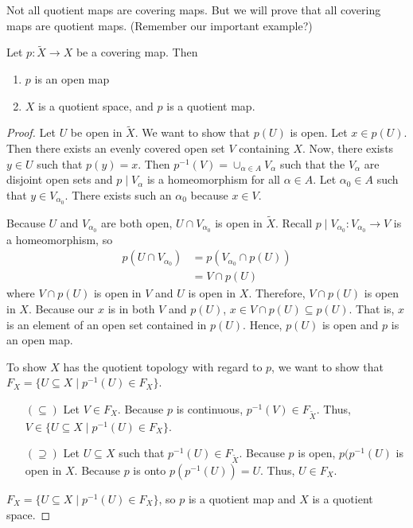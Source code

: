 Not all quotient maps are covering maps. But we will prove that all covering maps are quotient maps. (Remember our important example?)
\begin{theorem}
	Let $p:\widetilde{X}\rightarrow X$ be a covering map. Then 
	\begin{enumerate}
		\item $p$ is an open map 
		\item $X$ is a quotient space, and $p$ is a quotient map. 
	\end{enumerate}
\end{theorem}
\begin{proof}
	Let $U$ be open in $\widetilde{X}$. We want to show that $p(U)$ is open. Let $x \in p(U).$ Then there exists an evenly covered open set $V$ containing $X$. Now, there exists $y \in U$ such that $p(y)=x.$ Then $p^{-1}(V)=\cup_{\alpha \in A}V_{\alpha}$ such that the $V_{\alpha}$ are disjoint open sets and $p \mid V_{\alpha}$ is a homeomorphism for all $\alpha \in A$. Let $\alpha_0 \in A$ such that $y \in V_{\alpha_0}$. There exists such an $\alpha_0$ because $x \in V$.
	
	Because $U$ and $V_{\alpha_0}$ are both open, $U\cap V_{\alpha_0}$ is open in $\widetilde{X}$. Recall $p\mid V_{\alpha_0}:V_{\alpha_0}\rightarrow V$ is a homeomorphism, so 
	\begin{align*}
		p(U\cap V_{\alpha_0})&=p\left(V_{\alpha_0}\cap p(U)\right)\\
		&=V\cap p(U) 
	\end{align*}
	where $V\cap p(U)$ is open in $V$ and $U$ is open in $X$. Therefore, $V\cap p(U)$ is open in $X$. Because our $x$ is in both $V$ and $p(U)$, $x\in V\cap p(U)\subseteq p(U)$. That is, $x$ is an element of an open set contained in $p(U)$. Hence, $p(U)$ is open and $p$ is an open map. 
	\item To show $X$ has the quotient topology with regard to $p$, we want to show that $F_X = \{U\subseteq X \mid p^{-1}(U)\in F_X\}$.
	\begin{itemize}
		\item[$(\subseteq)$] Let $V\in F_X$. Because $p$ is continuous, $p^{-1}(V)\in F_{\widetilde{X}}$. Thus, $V\in \{U\subseteq X \mid p^{-1}(U)\in F_X\}$.
		
		\item[$(\supseteq)$] Let $U\subseteq X$ such that $p^{-1}(U)\in F_{\widetilde{X}}$. Because $p$ is open, $p(p^{-1}(U)$ is open in $X$. Because $p$ is onto $p(p^{-1}(U))=U$. Thus, $U\in F_X$. 
	\end{itemize}
	
	$F_X = \{U\subseteq X \mid p^{-1}(U)\in F_X\}$, so $p$ is a quotient map and $X$ is a quotient space. 
\end{proof}

